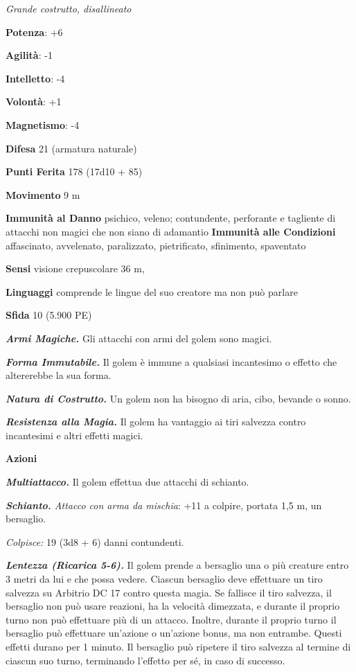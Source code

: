\begin{multicols}{2}
\emph{Grande costrutto, disallineato}

\textbf{Potenza}: +6

\textbf{Agilità}: -1

\textbf{Intelletto}: -4

\textbf{Volontà}: +1

\textbf{Magnetismo}: -4

\textbf{Difesa} 21 (armatura naturale)

\textbf{Punti Ferita} 178 (17d10 + 85)

\textbf{Movimento} 9 m

\textbf{Immunità al Danno} psichico, veleno; contundente, perforante e
tagliente di attacchi non magici che non siano di adamantio
\textbf{Immunità alle Condizioni} affascinato, avvelenato, paralizzato,
pietrificato, sfinimento, spaventato

\textbf{Sensi} visione crepuscolare 36 m, 

\textbf{Linguaggi} comprende le lingue del suo creatore ma non può
parlare

\textbf{Sfida} 10 (5.900 PE)

\emph{\textbf{Armi Magiche.}} Gli attacchi con armi del golem sono
magici.

\emph{\textbf{Forma Immutabile.}} Il golem è immune a qualsiasi
incantesimo o effetto che altererebbe la sua forma.

\emph{\textbf{Natura di Costrutto.}} Un golem non ha bisogno di aria,
cibo, bevande o sonno.

\emph{\textbf{Resistenza alla Magia.}} Il golem ha vantaggio ai tiri
salvezza contro incantesimi e altri effetti magici.

\textbf{Azioni}

\emph{\textbf{Multiattacco.}} Il golem effettua due attacchi di
schianto.

\emph{\textbf{Schianto.} Attacco con arma da mischia}: +11 a colpire,
portata 1,5 m, un bersaglio.

\emph{Colpisce:} 19 (3d8 + 6) danni contundenti.

\emph{\textbf{Lentezza (Ricarica 5-6).}} Il golem prende a bersaglio una
o più creature entro 3 metri da lui e che possa vedere. Ciascun
bersaglio deve effettuare un tiro salvezza su Arbitrio DC 17 contro
questa magia. Se fallisce il tiro salvezza, il bersaglio non può usare
reazioni, ha la velocità dimezzata, e durante il proprio turno non può
effettuare più di un attacco. Inoltre, durante il proprio turno il
bersaglio può effettuare un'azione o un'azione bonus, ma non entrambe.
Questi effetti durano per 1 minuto. Il bersaglio può ripetere il tiro
salvezza al termine di ciascun suo turno, terminando l'effetto per sé,
in caso di successo.


\end{multicols}
